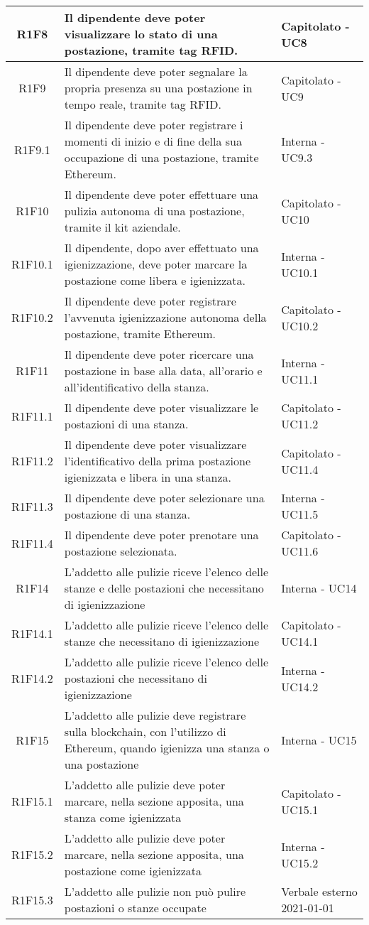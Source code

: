 \begin{center}
\begin{longtable}{|c|p{10cm}|p{4cm}|}
\hline
					R1F8&Il dipendente deve poter visualizzare lo stato di una postazione, tramite tag RFID.	&Capitolato - UC8 	\\
					\hline
			R1F9&Il dipendente deve poter segnalare la propria presenza su una postazione in tempo reale, tramite tag RFID.	&Capitolato - UC9 	\\
		\hline
		R1F9.1&Il dipendente deve poter registrare i momenti di inizio e di fine della sua occupazione di una postazione, tramite Ethereum.	&Interna - UC9.3 	\\
		\hline	
		R1F10&Il dipendente deve poter effettuare una pulizia autonoma di una postazione, tramite il kit aziendale.	&Capitolato - UC10	\\
		\hline		
		R1F10.1&Il dipendente, dopo aver effettuato una igienizzazione, deve poter marcare la postazione come libera e igienizzata.	&Interna - UC10.1	\\
		\hline	
		R1F10.2&Il dipendente deve poter registrare l'avvenuta igienizzazione autonoma della postazione, tramite Ethereum.	&Capitolato - UC10.2	\\
		\hline	
		R1F11&Il dipendente deve poter ricercare una postazione in base alla data, all'orario e all'identificativo della stanza.	&Interna - UC11.1	\\
		\hline
		R1F11.1&Il dipendente deve poter visualizzare le postazioni di una stanza.	&Capitolato - UC11.2	\\
		\hline
		R1F11.2&Il dipendente deve poter visualizzare l'identificativo della prima postazione igienizzata e libera in una stanza.	&Capitolato - UC11.4	\\
		\hline
		R1F11.3&Il dipendente deve poter selezionare una postazione di una stanza.	&Interna - UC11.5	\\
		\hline
		R1F11.4&Il dipendente deve poter prenotare una postazione selezionata.	&Capitolato - UC11.6	\\
		\hline
R1F14&L'addetto alle pulizie riceve l'elenco delle stanze e delle postazioni che necessitano di igienizzazione	& Interna - UC14	\\
						\hline
			R1F14.1&	L'addetto alle pulizie riceve l'elenco delle stanze che necessitano di igienizzazione& 	Capitolato - UC14.1\\
					\hline
			R1F14.2&L'addetto alle pulizie riceve l'elenco delle postazioni che necessitano di igienizzazione	& Interna - UC14.2	\\
					\hline
R1F15&L'addetto alle pulizie deve registrare sulla blockchain, con l'utilizzo di Ethereum, quando igienizza una stanza o una postazione	& Interna - UC15	\\
					\hline
R1F15.1&L'addetto alle pulizie deve poter marcare, nella sezione apposita, una stanza come igienizzata	& Capitolato - UC15.1	\\
						\hline
			R1F15.2&L'addetto alle pulizie deve poter marcare, nella sezione apposita, una postazione come igienizzata	&Interna - UC15.2 	\\
					\hline
			R1F15.3&L'addetto alle pulizie non può pulire postazioni o stanze occupate	& Verbale esterno 2021-01-01	\\
					\hline
						

\end{longtable}
\end{center}
